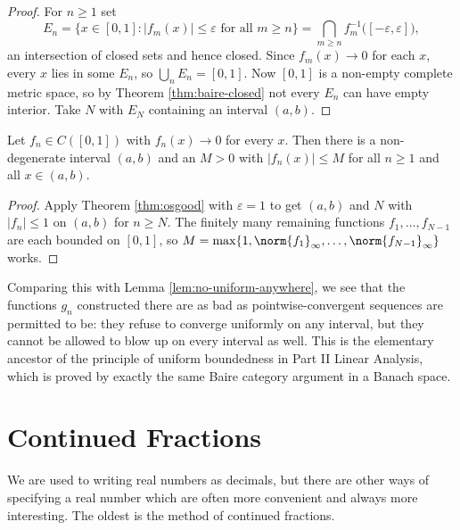 \begin{proof}
	For $n\geq1$ set
	$$E_n = \{x\in[0,1] : |f_m(x)|\leq\varepsilon\text{ for all }m\geq n\} = \bigcap_{m\geq n}f_m^{-1}\big([-\varepsilon,\varepsilon]\big),$$
	an intersection of closed sets and hence closed. Since $f_m(x)\to0$ for each $x$, every $x$ lies in some $E_n$, so $\bigcup_nE_n=[0,1]$. Now $[0,1]$ is a non-empty complete metric space, so by Theorem \ref{thm:baire-closed} not every $E_n$ can have empty interior. Take $N$ with $E_N$ containing an interval $(a,b)$.
\end{proof}

\begin{corollary}\label{cor:uniform-bdd}
	Let $f_n\in C([0,1])$ with $f_n(x)\to0$ for every $x$. Then there is a non-degenerate interval $(a,b)$ and an $M>0$ with $|f_n(x)|\leq M$ for all $n\geq1$ and all $x\in(a,b)$.
\end{corollary}

\begin{proof}
	Apply Theorem \ref{thm:osgood} with $\varepsilon=1$ to get $(a,b)$ and $N$ with $|f_n|\leq1$ on $(a,b)$ for $n\geq N$. The finitely many remaining functions $f_1,\ldots,f_{N-1}$ are each bounded on $[0,1]$, so $M = \max\{1,\norm{f_1}_\infty,\ldots,\norm{f_{N-1}}_\infty\}$ works.
\end{proof}

Comparing this with Lemma \ref{lem:no-uniform-anywhere}, we see that the functions $g_n$ constructed there are as bad as pointwise-convergent sequences are permitted to be: they refuse to converge uniformly on any interval, but they cannot be allowed to blow up on every interval as well. This is the elementary ancestor of the principle of uniform boundedness in Part II Linear Analysis, which is proved by exactly the same Baire category argument in a Banach space.

\section{Continued Fractions}

We are used to writing real numbers as decimals, but there are other ways of specifying a real number which are often more convenient and always more interesting. The oldest is the method of continued fractions.

